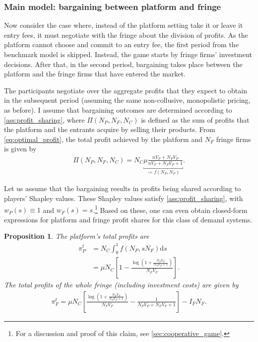 \documentclass[a4paper]{article}
\newtheorem{proposition}{Proposition}
\newcommand{\ds}{\mathrm{d}s}
\begin{document}
\subsubsection{Main model: bargaining between platform and fringe}

Now consider the case where, instead of the platform setting take it or leave it entry fees, it must negotiate with the fringe about the division of profits.
As the platform cannot choose and commit to an entry fee, the first period from the benchmark model is skipped.
Instead, the game starts by fringe firms' investment decisions.
After that, in the second period, bargaining takes place between the platform and the fringe firms that have entered the market.

The participants negotiate over the aggregate profits that they expect to obtain in the subsequent period (assuming the same non-collusive, monopolistic pricing, as before).
I assume that bargaining outcomes are determined according to \cref{ass:profit_sharing}, where $\Pi(N_P, N_F, N_C)$ is defined as the sum of profits that the platform and the entrants acquire by selling their products.
From \cref{eq:optimal_profit}, the total profit achieved by the platform and $N_F$ fringe firms is given by
\begin{align*}
    \Pi(N_P, N_F, N_C) = N_C \underbracket{\mu \frac{n V_F + N_P V_P}{n V_F + N_P V_P + 1}}_{\coloneqq f(N_P, N_F)}.
\end{align*}

Let us assume that the bargaining results in profits being shared according to players' Shapley values.
These Shapley values satisfy \cref{ass:profit_sharing}, with $w_P(s) \equiv 1$ and $w_F(s) = s$.\footnote{
    For a discussion and proof of this claim, see \cref{sec:cooperative_game}.
}
Based on these, one can even obtain closed-form expressions for platform and fringe profit shares for this class of demand systems.
\begin{proposition}
    \label{prop:platform_profits_bargaining}
    The platform's total profits are
    \begin{align*}
        \pi^t_P &= N_C \int_0^1 f(N_P, sN_F) \ds \\
                &= \mu N_C \left[ 1 - \frac{\log \left(1 + \frac{N_F V_F}{N_P V_P + 1} \right)}{N_F V_F} \right].
    \end{align*}
    The total profits of the whole fringe (including investment costs) are given by
    \begin{align*}
        \pi^t_F = \mu N_C \left[ \frac{\log \left( 1 + \frac{N_F V_F}{N_P V_P + 1} \right)}{N_F V_F} - \frac{1}{N_P V_P + N_F V_F + 1} \right] - I_F N_F .
    \end{align*}
\end{proposition}
\end{document}
